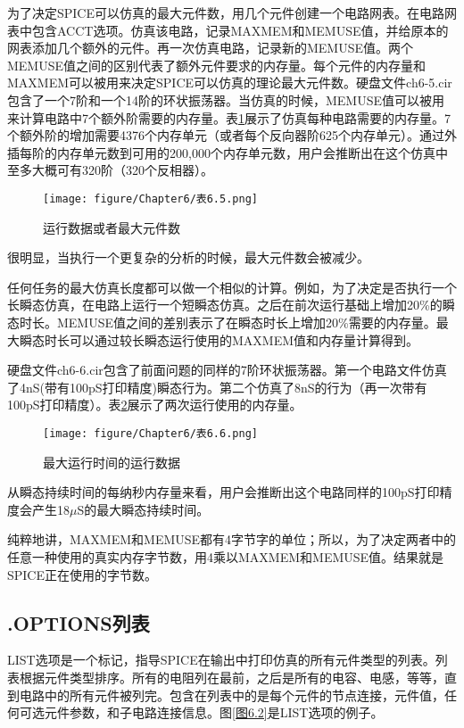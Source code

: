 为了决定SPICE可以仿真的最大元件数，用几个元件创建一个电路网表。在电路网表中包含ACCT选项。仿真该电路，记录MAXMEM和MEMUSE值，并给原本的网表添加几个额外的元件。再一次仿真电路，记录新的MEMUSE值。两个MEMUSE值之间的区别代表了额外元件要求的内存量。每个元件的内存量和MAXMEM可以被用来决定SPICE可以仿真的理论最大元件数。硬盘文件ch6-5.cir包含了一个7阶和一个14阶的环状振荡器。当仿真的时候，MEMUSE值可以被用来计算电路中7个额外阶需要的内存量。表\ref{表6.5}展示了仿真每种电路需要的内存量。7个额外阶的增加需要4376个内存单元（或者每个反向器阶625个内存单元）。通过外插每阶的内存单元数到可用的200,000个内存单元数，用户会推断出在这个仿真中至多大概可有320阶（320个反相器）。

\begin{figure}[htbp]
\small
    \centering
    \texttt{[image: figure/Chapter6/表6.5.png]}
    \caption{运行数据或者最大元件数}
    \label{表6.5}
\end{figure}

很明显，当执行一个更复杂的分析的时候，最大元件数会被减少。

任何任务的最大仿真长度都可以做一个相似的计算。例如，为了决定是否执行一个长瞬态仿真，在电路上运行一个短瞬态仿真。之后在前次运行基础上增加20\%的瞬态时长。MEMUSE值之间的差别表示了在瞬态时长上增加20\%需要的内存量。最大瞬态时长可以通过较长瞬态运行使用的MAXMEM值和内存量计算得到。

硬盘文件ch6-6.cir包含了前面问题的同样的7阶环状振荡器。第一个电路文件仿真了4nS(带有100pS打印精度)瞬态行为。第二个仿真了8nS的行为（再一次带有100pS打印精度）。表\ref{表6.6}展示了两次运行使用的内存量。

\begin{figure}[htbp]
\small
    \centering
    \texttt{[image: figure/Chapter6/表6.6.png]}
    \caption{最大运行时间的运行数据}
    \label{表6.6}
\end{figure}

从瞬态持续时间的每纳秒内存量来看，用户会推断出这个电路同样的100pS打印精度会产生18$\mu$S的最大瞬态持续时间。

纯粹地讲，MAXMEM和MEMUSE都有4字节字的单位；所以，为了决定两者中的任意一种使用的真实内存字节数，用4乘以MAXMEM和MEMUSE值。结果就是SPICE正在使用的字节数。

\subsection{.OPTIONS列表}
LIST选项是一个标记，指导SPICE在输出中打印仿真的所有元件类型的列表。列表根据元件类型排序。所有的电阻列在最前，之后是所有的电容、电感，等等，直到电路中的所有元件被列完。包含在列表中的是每个元件的节点连接，元件值，任何可选元件参数，和子电路连接信息。图\ref{图6.2}是LIST选项的例子。

